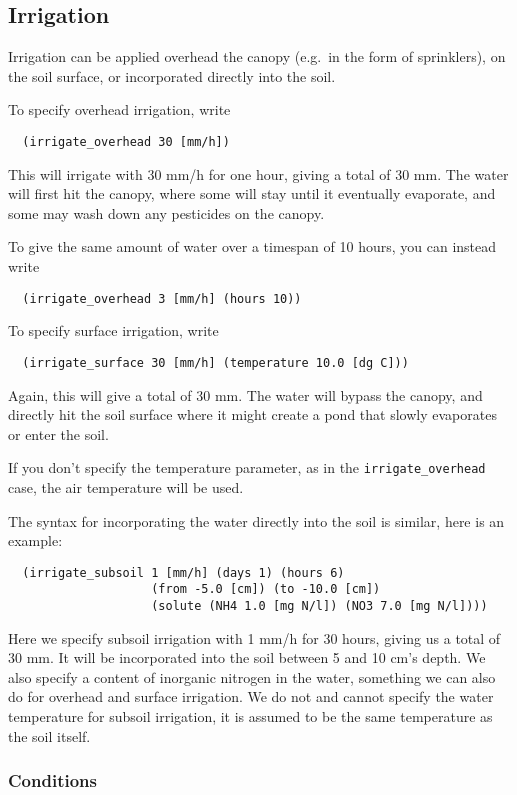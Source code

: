 \documentclass[a4paper]{article}
\begin{document}
\subsection{Irrigation}
\label{sec:irrigation}

Irrigation can be applied overhead the canopy (e.g.\ in the form of
sprinklers), on the soil surface, or incorporated directly into the
soil. 

To specify overhead irrigation, write
\begin{verbatim}
  (irrigate_overhead 30 [mm/h])
\end{verbatim}
This will irrigate with 30 mm/h for one hour, giving a total of 30 mm.
The water will first hit the canopy, where some will stay until it
eventually evaporate, and some may wash down any pesticides on the
canopy.

To give the same amount of water over a timespan of 10 hours, you can
instead write 
\begin{verbatim}
  (irrigate_overhead 3 [mm/h] (hours 10))
\end{verbatim}

To specify surface irrigation, write
\begin{verbatim}
  (irrigate_surface 30 [mm/h] (temperature 10.0 [dg C]))
\end{verbatim}
Again, this will give a total of 30 mm.  The water will bypass the
canopy, and directly hit the soil surface where it might create a pond
that slowly evaporates or enter the soil.

If you don't specify the temperature parameter, as in the
\texttt{irrigate\_overhead} case, the air temperature will be used.

The syntax for incorporating the water directly into the soil is
similar, here is an example:
\begin{verbatim}
  (irrigate_subsoil 1 [mm/h] (days 1) (hours 6)
                    (from -5.0 [cm]) (to -10.0 [cm])
                    (solute (NH4 1.0 [mg N/l]) (NO3 7.0 [mg N/l])))
\end{verbatim}
Here we specify subsoil irrigation with 1 mm/h for 30 hours, giving us
a total of 30 mm.  It will be incorporated into the soil between 5 and
10 cm's depth.  We also specify a content of inorganic nitrogen in the
water, something we can also do for overhead and surface irrigation.
We do not and cannot specify the water temperature for subsoil
irrigation, it is assumed to be the same temperature as the soil
itself.

\subsubsection{Conditions}
\end{document}
